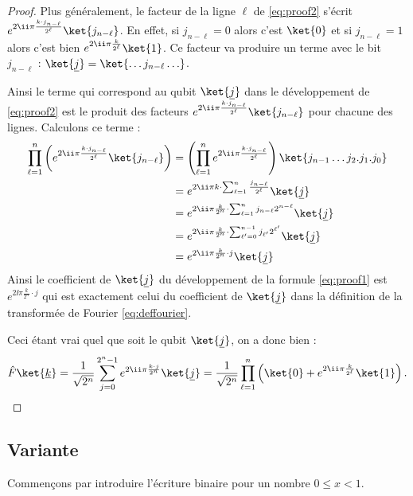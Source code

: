 \documentclass[11pt,class=report,crop=false]{standalone}
\begin{document}
\begin{proof}
Plus généralement, le facteur de la ligne $\ell$  de \eqref{eq:proof2} s'écrit $e^{2\ii \pi \frac{k \cdot j_{n-\ell}}{2^\ell}} \ket{j_{n-\ell}}$. En effet, si $j_{n-\ell}=0$ alors c'est $\ket{0}$ et si $j_{n-\ell}=1$ alors c'est bien
$e^{2\ii \pi \frac{k}{2^\ell}} \ket{1}$.
Ce facteur va produire un terme avec le bit $j_{n-\ell}$  : 
$\ket{\underline{j}} = \ket{\ldots j_{n-\ell} \ldots}$.

Ainsi le terme qui correspond au qubit $\ket{\underline{j}}$ dans le développement de  \eqref{eq:proof2} est le produit des facteurs $e^{2\ii \pi \frac{k \cdot j_{n-\ell}}{2^\ell}} \ket{j_{n-\ell}}$
pour chacune des lignes. Calculons ce terme :
\begin{align*}
\prod_{\ell=1}^{n} \left( e^{2\ii \pi \frac{k \cdot j_{n-\ell}}{2^\ell}} \ket{j_{n-\ell}} \right) 
 &= \left(\prod_{\ell=1}^{n} e^{2\ii \pi \frac{k \cdot j_{n-\ell}}{2^\ell}}\right)  \ket{j_{n-1} \ldots j_2 .j_1.j_0} \\
 &= e^{2\ii \pi k  \cdot \sum_{\ell=1}^{n}\frac{j_{n-\ell}}{2^\ell}} \ket{\underline{j}} \\
 &= e^{2\ii \pi \frac{k}{2^n}  \cdot \sum_{\ell=1}^{n} j_{n-\ell}{2^{n-\ell}}} \ket{\underline{j}} \\
 &= e^{2\ii \pi \frac{k}{2^n}  \cdot \sum_{\ell'=0}^{n-1} j_{\ell'}{2^{\ell'}}} \ket{\underline{j}} \\
 &= e^{2\ii \pi \frac{k}{2^n} \cdot j} \ket{\underline{j}} \\
\end{align*}
Ainsi le coefficient  de $\ket{\underline{j}}$ du développement de la formule 
\eqref{eq:proof1} est $e^{2\ii \pi \frac{k}{2^n} \cdot j}$ qui est exactement celui du  
coefficient de $\ket{\underline{j}}$ dans la définition de la transformée de Fourier \eqref{eq:deffourier}.

Ceci étant vrai quel que soit le qubit $\ket{\underline{j}}$, on a donc bien :
$$
\hat F \ket{\underline k} 
= \frac{1}{\sqrt{2^n}} \sum_{j=0}^{2^n-1} e^{2\ii \pi \frac{k \cdot j}{2^n}} \ket{\underline j}
= \frac{1}{\sqrt{2^n}} \prod_{\ell=1}^{n} 
\left( \ket{0} + e^{2\ii \pi \frac{k}{2^\ell}} \ket{1} \right).
$$
\end{proof}


\subsection{Variante}

Commençons par introduire l'écriture binaire pour un nombre $0 \le x < 1$.
\end{document}
